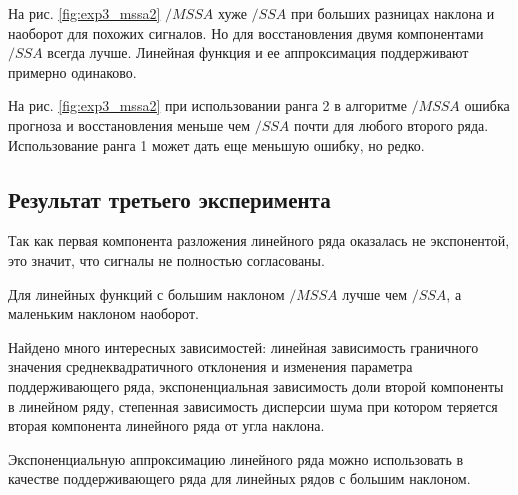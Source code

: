 \documentclass[specialist, substylefile = spbureport.rtx,
    subf,href,colorlinks=true, 12pt]{disser}
\newcommand{\MSSA}{\mathsf{MSSA}}
\begin{document}
        На рис. \ref{fig:exp3_mssa2} $/MSSA$ хуже $/SSA$ при больших разницах наклона и наоборот для похожих сигналов. Но для восстановления двумя компонентами $/SSA$ всегда лучше. Линейная функция и ее аппроксимация поддерживают примерно одинаково.

        На рис. \ref{fig:exp3_mssa2} при использовании ранга 2 в алгоритме $/MSSA$ ошибка прогноза и восстановления меньше чем $/SSA$ почти для любого второго ряда. Использование ранга 1 может дать еще меньшую ошибку, но редко. 


    \subsection{Результат третьего эксперимента}
        Так как первая компонента разложения линейного ряда оказалась не экспонентой, это значит, что сигналы не полностью согласованы.

        Для линейных функций с большим наклоном $/MSSA$ лучше чем $/SSA$, а маленьким наклоном наоборот.




    \conclusion
        Найдено много интересных зависимостей: линейная зависимость граничного значения среднеквадратичного отклонения и изменения параметра поддерживающего ряда, экспоненциальная зависимость доли второй компоненты в линейном ряду, степенная зависимость дисперсии шума при котором теряется вторая компонента линейного ряда от угла наклона.

        Экспоненциальную аппроксимацию линейного ряда можно использовать в качестве поддерживающего ряда для линейных рядов с большим наклоном.
 
        

    

	\renewcommand{\refname}{}
	\vspace{-25pt}
	
	
\end{document}
